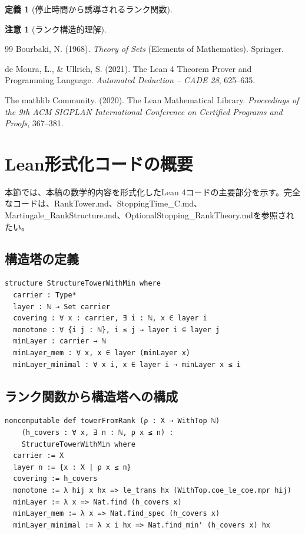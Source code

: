 \documentclass[a4paper,11pt]{ltjsarticle}
\theoremstyle{definition}
\newtheorem{definition}[theorem]{定義}
\newtheorem{remark}[theorem]{注意}
\begin{document}
\begin{definition}[停止時間から誘導されるランク関数]
\begin{remark}[ランク構造的理解]
\begin{thebibliography}{99}
Bourbaki, N. (1968).
\textit{Theory of Sets} (Elements of Mathematics).
Springer.

de Moura, L., \& Ullrich, S. (2021).
The Lean 4 Theorem Prover and Programming Language.
\textit{Automated Deduction -- CADE 28}, 625--635.

The mathlib Community. (2020).
The Lean Mathematical Library.
\textit{Proceedings of the 9th ACM SIGPLAN International Conference on Certified Programs and Proofs}, 367--381.

\end{thebibliography}

\appendix

\section{Lean形式化コードの概要}

本節では、本稿の数学的内容を形式化したLean 4コードの主要部分を示す。完全なコードは、RankTower.md、StoppingTime\_C.md、Martingale\_RankStructure.md、OptionalStopping\_RankTheory.mdを参照されたい。

\subsection{構造塔の定義}

\begin{verbatim}
structure StructureTowerWithMin where
  carrier : Type*
  layer : ℕ → Set carrier
  covering : ∀ x : carrier, ∃ i : ℕ, x ∈ layer i
  monotone : ∀ {i j : ℕ}, i ≤ j → layer i ⊆ layer j
  minLayer : carrier → ℕ
  minLayer_mem : ∀ x, x ∈ layer (minLayer x)
  minLayer_minimal : ∀ x i, x ∈ layer i → minLayer x ≤ i
\end{verbatim}

\subsection{ランク関数から構造塔への構成}

\begin{verbatim}
noncomputable def towerFromRank (ρ : X → WithTop ℕ)
    (h_covers : ∀ x, ∃ n : ℕ, ρ x ≤ n) :
    StructureTowerWithMin where
  carrier := X
  layer n := {x : X | ρ x ≤ n}
  covering := h_covers
  monotone := λ hij x hx => le_trans hx (WithTop.coe_le_coe.mpr hij)
  minLayer := λ x => Nat.find (h_covers x)
  minLayer_mem := λ x => Nat.find_spec (h_covers x)
  minLayer_minimal := λ x i hx => Nat.find_min' (h_covers x) hx
\end{verbatim}


\end{remark}
\end{definition}
\end{document}
